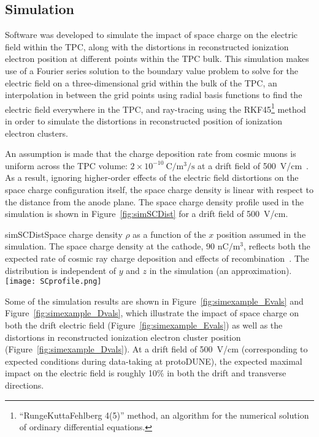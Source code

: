 \subsection{Simulation} \label{sec:SCEsim}

Software was developed \cite{SCEsimNote} to simulate the impact of space charge on the electric field within the TPC, along with the distortions in reconstructed ionization electron position at different points within the TPC bulk.  This simulation makes use of a Fourier series solution to the boundary value problem to solve for the electric field on a three-dimensional grid within the bulk of the TPC, an interpolation in between the grid points using radial basis functions to find the electric field everywhere in the TPC, and ray-tracing using the RKF45\footnote{``RungeKuttaFehlberg 4(5)'' method, an algorithm for the numerical solution of ordinary differential equations.} method in order to simulate the distortions in reconstructed position of ionization electron clusters.

An assumption is made that the charge deposition rate from cosmic muons is uniform across the TPC volume:  $2{\times}10^{-10}~\mathrm{C}/\mathrm{m}^{3}/\mathrm{s}$ at a drift field of 500~V/cm~\cite{KirkSCE}.  As a result, ignoring higher-order effects of the electric field distortions on the space charge configuration itself, the space charge density is linear with respect to the distance from the anode plane.  The space charge density profile used in the simulation is shown in Figure~\ref{fig:simSCDist} for a drift field of 500~V/cm.

\begin{cdrfigure}{simSCDist}{Space charge density $\rho$ as a function of the $x$ position assumed in the simulation. The space charge density at the cathode, $90$ $\mathrm{nC}/\mathrm{m}^3$, reflects both the expected rate of cosmic ray charge deposition and effects of recombination~\cite{KirkSCE}. The distribution is independent of $y$ and $z$ in the simulation (an approximation).}
\texttt{[image: SCprofile.png]}
\end{cdrfigure}


Some of the simulation results are shown in Figure~\ref{fig:simexample_Evals} and Figure~\ref{fig:simexample_Dvals}, which illustrate the impact of space charge on both the drift electric field (Figure~\ref{fig:simexample_Evals}) as well as the distortions in reconstructed ionization electron cluster position (Figure~\ref{fig:simexample_Dvals}).  At a drift field of 500~V/cm (corresponding to expected conditions during data-taking at protoDUNE), the expected maximal impact on the electric field is roughly 10\% in both the drift and transverse directions.

